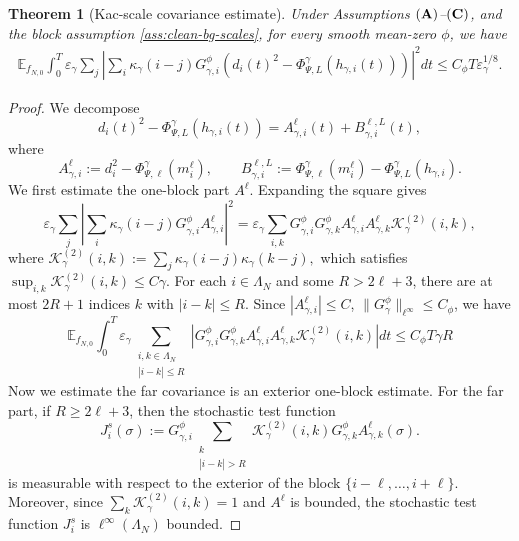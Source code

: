 \documentclass{article}
\newtheorem{theorem}{Theorem}
\begin{document}
\begin{theorem}[Kac-scale covariance estimate]\label{thm:clean-kac-covariance}
Under Assumptions \(({\bf A})\)--\(({\bf C})\), and the block assumption \eqref{ass:clean-bg-scales}, for every smooth mean-zero \(\phi\), we have
\begin{align}\label{eq:caling and block}
    \mathbb E_{f_{N,0}}\int_0^T \varepsilon_\gamma \sum_j\left| \sum_i \kappa_\gamma(i-j)G_{\gamma,i}^{\phi} \left( d_i(t)^2- \Phi_{\Psi,L}^{\gamma}(h_{\gamma,i}(t)) \right)\right|^2dt  \le C_{\phi}T \varepsilon^{1/8}_{\gamma}.
\end{align}
\end{theorem}

\begin{proof}
We decompose
\[
d_i(t)^2- \Phi_{\Psi,L}^{\gamma}(h_{\gamma,i}(t))  =A_{\gamma,i}^{\ell}(t) + B_{\gamma,i}^{\ell,L}(t),
\]
where
\[
A_{\gamma,i}^{\ell}:=d_i^2-
\Phi_{\Psi,\ell}^{\gamma}(m_i^\ell),
\qquad
B_{\gamma,i}^{\ell,L}:=
\Phi_{\Psi,\ell}^{\gamma}(m_i^\ell)-
\Phi_{\Psi,L}^{\gamma}(h_{\gamma,i}).
\]
We first estimate the one-block part \(A^\ell\).  Expanding the square gives
\[
    \varepsilon_\gamma\sum_j
\left|\sum_i\kappa_\gamma(i-j)G_{\gamma,i}^{\phi}A_{\gamma,i}^{\ell}
\right|^2 =
\varepsilon_\gamma
\sum_{i,k} G_{\gamma,i}^{\phi}G_{\gamma,k}^{\phi}
A_{\gamma,i}^{\ell}A_{\gamma,k}^{\ell}
\mathcal K_\gamma^{(2)}(i,k),
\]
where
\(
\mathcal K_{\gamma}^{(2)}(i,k)
:=
\sum_j\kappa_\gamma(i-j)\kappa_\gamma(k-j),
\)
which satisfies \(\sup_{i,k}\mathcal K_{\gamma}^{(2)}(i,k)\le C\gamma\).
For each \(i \in \Lambda_N\) and some $R > 2\ell +3$, there are
at most \(2R+1\) indices \(k\) with \(|i-k|\le R\).
Since \(|A_{\gamma,i}^{\ell}|\le C\),
\(\|G_\gamma^\phi\|_{\ell^\infty}\le C_\phi\),
we have
\begin{equation}
    \mathbb E_{f_{N,0}}\int_0^T \varepsilon_\gamma
\sum_{\substack{i,k \in \Lambda_{N}\\ |i-k|\le R}}\left|G_{\gamma,i}^{\phi}G_{\gamma,k}^{\phi}A_{\gamma,i}^{\ell}A_{\gamma,k}^{\ell}\mathcal K_\gamma^{(2)}(i,k)
\right|dt \le C_\phi T\gamma R
\end{equation}
Now we estimate the far covariance is an exterior one-block estimate.
For the far part, if \(R\ge2\ell+3\), then the stochastic test function
\[
J^{s}_i(\sigma):=G_{\gamma,i}^{\phi}
\sum_{\substack{k\\ |i-k|>R}}
\mathcal K_\gamma^{(2)}(i,k)
G_{\gamma,k}^{\phi}
A_{\gamma,k}^{\ell}(\sigma).
\]
is measurable with respect to the exterior of the block \(\{i-\ell,\ldots,i+\ell\}\).
Moreover, since \(\sum_k\mathcal K_\gamma^{(2)}(i,k)=1\) and \(A^\ell\) is bounded, the stochastic test function $J^{s}_i$ is $\ell^{\infty}(\Lambda_N)$ bounded.

\end{proof}
\end{document}
